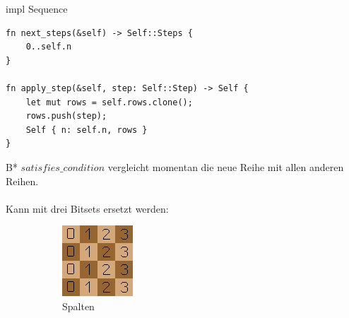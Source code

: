 \documentclass[aspectratio=43,t]{beamer}
\begin{document}
    \begin{frame}[fragile]{impl Sequence}
\begin{verbatim}
fn next_steps(&self) -> Self::Steps {
    0..self.n
}

fn apply_step(&self, step: Self::Step) -> Self {
    let mut rows = self.rows.clone();
    rows.push(step);
    Self { n: self.n, rows }
}
\end{verbatim}
    \end{frame}

    

    \begin{frame}{B*}
      $satisfies\_condition$ vergleicht momentan die neue Reihe mit allen anderen Reihen. \\
      \ \\
      Kann mit drei Bitsets ersetzt werden: \\
      \begin{figure}[h!]
        \centering
        \begin{subfigure}{0.3\linewidth}
          \includegraphics[width=\linewidth]{../img/columns.png}
          \caption{Spalten}
        \end{subfigure}
        \begin{subfigure}{0.3\linewidth}

\end{subfigure}
\end{figure}
\end{frame}
\end{document}
